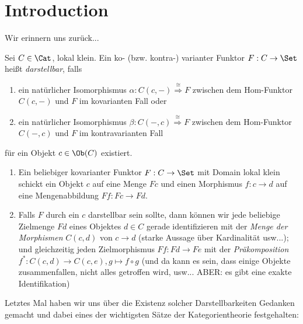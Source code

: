 \documentclass[11pt]{article}
\begin{document}

\tableofcontents

\newpage
\section{Introduction}
Wir erinnern uns zurück...
\begin{definition} 
    Sei $C \in \Cat$, lokal klein. Ein ko- (bzw. kontra-) varianter Funktor $F: C \to \Set$ heißt \emph{darstellbar}, falls 
    \begin{enumerate}[label=(\roman*)]
        \item ein natürlicher Isomorphismus $\alpha: C(c,-)\overset{\cong}{\Longrightarrow}F$ zwischen dem Hom-Funktor $C(c,-)$ und $F$ im kovarianten Fall oder
        \item ein natürlicher Isomorphismus $\beta: C(-,c)\overset{\cong}{\Longrightarrow} F$ zwischen dem Hom-Funktor $C(-,c)$ und $F$ im kontravarianten Fall 
    \end{enumerate}
    für ein Objekt $c\in \Ob(C)$ existiert.
\end{definition}

\begin{note}\mbox{}
\begin{enumerate}[label=-]
    \item Ein beliebiger kovarianter Funktor $F:C\to \Set$ mit Domain lokal klein schickt ein Objekt $c$ auf eine Menge $Fc$ und einen Morphismus $f:c\to d$ auf eine Mengenabbildung $Ff: Fc \to Fd$.
    \item Falls $F$ durch ein $c$ darstellbar sein sollte, dann können wir jede beliebige Zielmenge $Fd$ eines Objektes $d\in C$ gerade identifizieren mit der \emph{Menge der Morphismen} $C(c,d)$ von $c\to d$ (starke Aussage über Kardinalität usw...); und gleichzeitig jeden Zielmorphismus $Ff: Fd\to Fe$ mit der \emph{Präkomposition} $f^*: C(c,d) \to C(c,e), g\mapsto f\circ g$ (und da kann es sein, dass einige Objekte zusammenfallen, nicht alles getroffen wird, usw... ABER: es gibt eine exakte Identifikation)
\end{enumerate}
\end{note}

Letztes Mal haben wir uns über die Existenz solcher Darstellbarkeiten Gedanken gemacht und dabei eines der wichtigsten Sätze der Kategorientheorie festgehalten:
\end{document}
